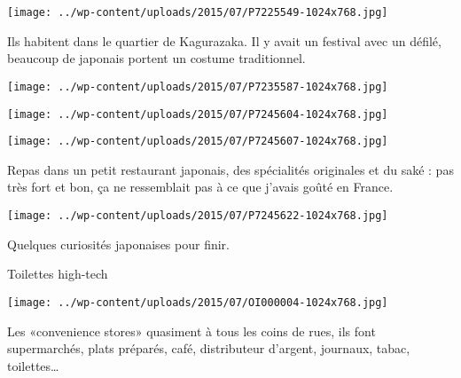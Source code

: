 \begin{center} \texttt{[image: ../wp-content/uploads/2015/07/P7225549-1024x768.jpg]} \end{center}

 

 Ils habitent dans le quartier de Kagurazaka. Il y avait un festival avec un défilé, beaucoup de japonais portent un costume traditionnel. 

 

\begin{center} \texttt{[image: ../wp-content/uploads/2015/07/P7235587-1024x768.jpg]} \end{center}

 

 

\begin{center} \texttt{[image: ../wp-content/uploads/2015/07/P7245604-1024x768.jpg]} \end{center}

 

 

\begin{center} \texttt{[image: ../wp-content/uploads/2015/07/P7245607-1024x768.jpg]} \end{center}

 

 Repas dans un petit restaurant japonais, des spécialités originales et du saké : pas très fort et bon, ça ne ressemblait pas à ce que j'avais goûté en France. 

 

\begin{center} \texttt{[image: ../wp-content/uploads/2015/07/P7245622-1024x768.jpg]} \end{center}

 

 Quelques curiosités japonaises pour finir. 

 Toilettes high-tech 

 

\begin{center} \texttt{[image: ../wp-content/uploads/2015/07/OI000004-1024x768.jpg]} \end{center}

 

 Les «convenience stores» quasiment à tous les coins de rues, ils font supermarchés, plats préparés, café, distributeur d'argent, journaux, tabac, toilettes… 

